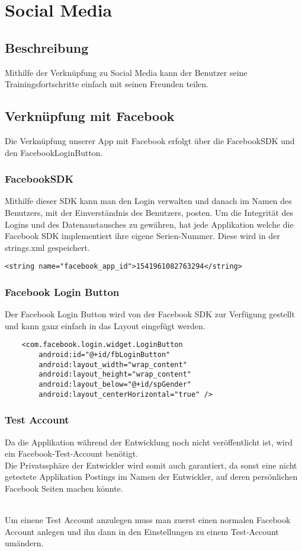 \documentclass[FIPLY_base.tex]{subfiles}
\begin{document}
\section{Social Media}
\subsection{Beschreibung}
Mithilfe der Verknüpfung zu Social Media kann der Benutzer seine Trainingsfortschritte einfach mit seinen Freunden teilen. 
\subsection{Verknüpfung mit Facebook}
Die Verknüpfung unserer App mit Facebook erfolgt über die FacebookSDK und den FacebookLoginButton.
\subsubsection{FacebookSDK}
Mithilfe dieser SDK kann man den Login verwalten und danach im Namen des Benutzers, mit der Einverständnis des Benutzers, posten.
Um die Integrität des Logins und des Datenaustausches zu gewähren, hat jede Applikation welche die Facebook SDK implementiert ihre eigene Serien-Nummer.
Diese wird in der strings.xml gespeichert.
\begin{lstlisting}
<string name="facebook_app_id">1541961082763294</string>
\end{lstlisting}
\subsubsection{Facebook Login Button}
Der Facebook Login Button wird von der Facebook SDK zur Verfügung gestellt und kann ganz einfach in das Layout eingefügt werden.
\begin{lstlisting}
    <com.facebook.login.widget.LoginButton
        android:id="@+id/fbLoginButton"
        android:layout_width="wrap_content"
        android:layout_height="wrap_content"
        android:layout_below="@+id/spGender"
        android:layout_centerHorizontal="true" />
\end{lstlisting}

\newpage
\subsubsection{Test Account}
Da die Applikation während der Entwicklung noch nicht veröffentlicht ist, wird ein Facebook-Test-Account benötigt. \ \\
Die Privatssphäre der Entwickler wird somit auch garantiert, da sonst eine nicht getestete Applikation Postings im Namen der Entwickler, auf deren persönlichen Facebook Seiten machen könnte.

\ \\
Um einene Test Account anzulegen muss man zuerst einen normalen Facebook Account anlegen und ihn dann in den Einstellungen zu einem Test-Account umändern.
\end{document}

